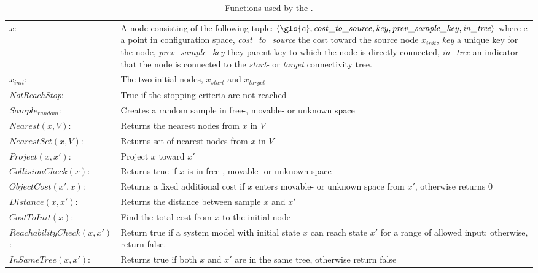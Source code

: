\noindent
\begin{table}[H]
  \centering
  \begin{tabular}%
  {>{\raggedright\arraybackslash}p{}%
   >{\raggedright\arraybackslash}p{}}
   $x$:& A node consisting of the following tuple: $ \left\langle \gls{c}, \mathit{cost\_to\_source}, \mathit{key}, \mathit{prev\_sample\_key}, \mathit{in\_tree} \right\rangle$ where \gls{c} a point in configuration space, \textit{cost\_to\_source} the cost toward the source node $x_{init}$, \textit{key} a unique key for the node, \textit{prev\_sample\_key} they parent key to which the node is directly connected, \textit{in\_tree} an indicator that the node is connected to the \textit{start-} or \textit{target} connectivity tree.\\
   $x_{init}$:& The two initial nodes, $x_{\mathit{start}}$ and $x_{\mathit{target}}$\\ 
  \textit{NotReachStop}:& True if the stopping criteria are not reached\\ 
  $\mathit{Sample_{random}}$:& Creates a random sample in free-, movable- or unknown space\\
  $\mathit{Nearest}(x, V)$:& Returns the nearest nodes from $x$ in $V$\\
  $\mathit{NearestSet}(x, V)$:& Returns set of nearest nodes from $x$ in $V$\\
  $\mathit{Project}(x, x')$:& Project $x$ toward $x'$\\
  $\mathit{CollisionCheck}(x)$:& Returns true if $x$ is in free-, movable- or unknown space\\
  $\mathit{ObjectCost}(x', x)$:& Returns a fixed additional cost if $x$ enters movable- or unknown space from $x'$, otherwise returns 0\\
  $\mathit{Distance}(x, x')$:& Returns the distance between sample $x$ and $x'$\\
  $\mathit{CostToInit}(x)$:& Find the total cost from $x$ to the initial node\\
    $\mathit{ReachabilityCheck}(x, x')$:& Return true if a system model with initial state $x$ can reach state $x'$ for a range of allowed input; otherwise, return false.\\
    $\mathit{InSameTree}(x, x')$:& Returns true if both $x$ and $x'$ are in the same tree, otherwise return false\\
  \end{tabular}
\caption{Functions used by the .}
\label{table:functions_for_proposed_rrt_star}
\end{table}


